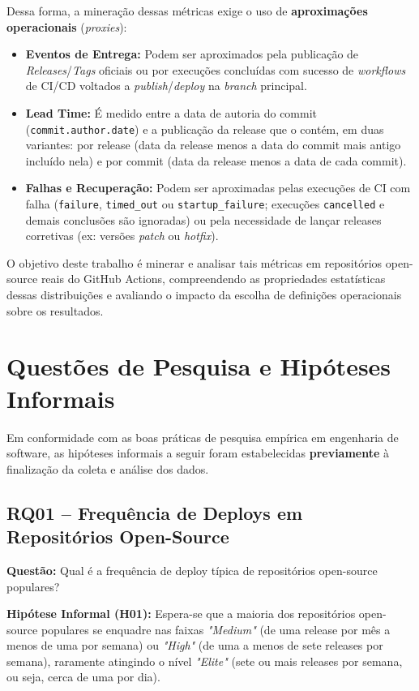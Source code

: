 \documentclass[12pt]{article}
\begin{document}
Dessa forma, a mineração dessas métricas exige o uso de \textbf{aproximações operacionais} (\textit{proxies}):
\begin{itemize}
    \item \textbf{Eventos de Entrega:} Podem ser aproximados pela publicação de \textit{Releases}/\textit{Tags} oficiais ou por execuções concluídas com sucesso de \textit{workflows} de CI/CD voltados a \textit{publish}/\textit{deploy} na \textit{branch} principal.
    \item \textbf{Lead Time:} É medido entre a data de autoria do commit (\texttt{commit.author.date}) e a publicação da release que o contém, em duas variantes: por release (data da release menos a data do commit mais antigo incluído nela) e por commit (data da release menos a data de cada commit).
    \item \textbf{Falhas e Recuperação:} Podem ser aproximadas pelas execuções de CI com falha (\texttt{failure}, \texttt{timed\_out} ou \texttt{startup\_failure}; execuções \texttt{cancelled} e demais conclusões são ignoradas) ou pela necessidade de lançar releases corretivas (ex: versões \textit{patch} ou \textit{hotfix}).
\end{itemize}

O objetivo deste trabalho é minerar e analisar tais métricas em repositórios open-source reais do GitHub Actions, compreendendo as propriedades estatísticas dessas distribuições e avaliando o impacto da escolha de definições operacionais sobre os resultados.

\section{Questões de Pesquisa e Hipóteses Informais}

Em conformidade com as boas práticas de pesquisa empírica em engenharia de software, as hipóteses informais a seguir foram estabelecidas \textbf{previamente} à finalização da coleta e análise dos dados.

\subsection{RQ01 -- Frequência de Deploys em Repositórios Open-Source}
\textbf{Questão:} Qual é a frequência de deploy típica de repositórios open-source populares?

\textbf{Hipótese Informal (H01):} Espera-se que a maioria dos repositórios open-source populares se enquadre nas faixas \textit{"Medium"} (de uma release por mês a menos de uma por semana) ou \textit{"High"} (de uma a menos de sete releases por semana), raramente atingindo o nível \textit{"Elite"} (sete ou mais releases por semana, ou seja, cerca de uma por dia).
\end{document}
